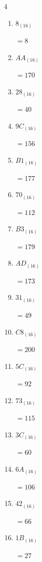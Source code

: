 \begin{multicols}{4}
\begin{enumerate}
  \item $8_{(16)}$

        $=8$

  \item $AA_{(16)}$

        $=170$

\columnbreak %

\resetques

  \item $28_{(16)}$

        $=40$

  \item $9C_{(16)}$

        $=156$

  \item $B1_{(16)}$

        $=177$

  \item $70_{(16)}$

        $=112$

  \item $B3_{(16)}$

        $=179$

  \item $AD_{(16)}$

        $=173$

  \item $31_{(16)}$

        $=49$

  \item $C8_{(16)}$

        $=200$

  \item $5C_{(16)}$

        $=92$

  \item $73_{(16)}$

        $=115$

  \item $3C_{(16)}$

        $=60$

  \item $6A_{(16)}$

        $=106$

  \item $42_{(16)}$

        $=66$

  \item $1B_{(16)}$

        $=27$


\end{enumerate}
\end{multicols}
